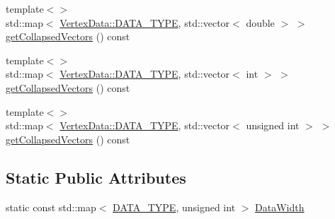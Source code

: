 \begin{DoxyCompactItemize}
\item 
{\footnotesize template$<$$>$ }\\std\+::map$<$ \hyperlink{class_graphics_1_1_vertex_data_a50e88236939dc2a3ec4df7aeb728620e}{Vertex\+Data\+::\+D\+A\+T\+A\+\_\+\+T\+Y\+P\+E}, std\+::vector$<$ double $>$ $>$ \hyperlink{class_graphics_1_1_vertex_data_a460ef7490af53909849ede22d63f3144}{get\+Collapsed\+Vectors} () const 
\item 
{\footnotesize template$<$$>$ }\\std\+::map$<$ \hyperlink{class_graphics_1_1_vertex_data_a50e88236939dc2a3ec4df7aeb728620e}{Vertex\+Data\+::\+D\+A\+T\+A\+\_\+\+T\+Y\+P\+E}, std\+::vector$<$ int $>$ $>$ \hyperlink{class_graphics_1_1_vertex_data_a198830ed9c9eaadd45776b17bfa2909d}{get\+Collapsed\+Vectors} () const 
\item 
{\footnotesize template$<$$>$ }\\std\+::map$<$ \hyperlink{class_graphics_1_1_vertex_data_a50e88236939dc2a3ec4df7aeb728620e}{Vertex\+Data\+::\+D\+A\+T\+A\+\_\+\+T\+Y\+P\+E}, std\+::vector$<$ unsigned int $>$ $>$ \hyperlink{class_graphics_1_1_vertex_data_a1a056a887e89425563b93c7d14402a21}{get\+Collapsed\+Vectors} () const 
\end{DoxyCompactItemize}
\subsection*{Static Public Attributes}
\begin{DoxyCompactItemize}
\item 
static const std\+::map$<$ \hyperlink{class_graphics_1_1_vertex_data_a50e88236939dc2a3ec4df7aeb728620e}{D\+A\+T\+A\+\_\+\+T\+Y\+P\+E}, unsigned int $>$ \hyperlink{class_graphics_1_1_vertex_data_af49335b9e9bb94a48d1ade3e798278eb}{Data\+Width}
\end{DoxyCompactItemize}
